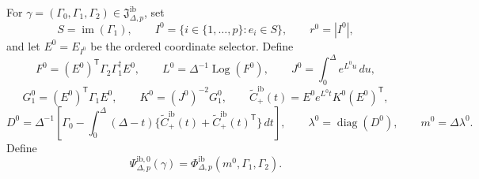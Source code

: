 For \(\gamma=(\Gamma_0,\Gamma_1,\Gamma_2)\in\mathfrak J_{\Delta,p}^{\mathrm{ib}}\), set
\[
 S=\operatorname{im}(\Gamma_1),\qquad
 I^0=\{i\in\{1,\ldots,p\}:e_i\in S\},\qquad
 r^0=|I^0|,
\]
and let \(E^0=E_{I^0}\) be the ordered coordinate selector.  Define
\[
 F^0=(E^0)^{\mathsf T}\Gamma_2\Gamma_1^\dagger E^0,\qquad
 L^0=\Delta^{-1}\operatorname{Log}(F^0),\qquad
 J^0=\int_0^\Delta e^{L^0u}\,du,
\]
\[
 G_1^0=(E^0)^{\mathsf T}\Gamma_1E^0,\qquad
 K^0=(J^0)^{-2}G_1^0,\qquad
 \widetilde C_{+}^{\mathrm{ib}}(t)=E^0e^{L^0t}K^0(E^0)^{\mathsf T},
\]
\[
 D^0=\Delta^{-1}\!\left[\Gamma_0-
 \int_0^\Delta(\Delta-t)
 \{\widetilde C_{+}^{\mathrm{ib}}(t)+\widetilde C_{+}^{\mathrm{ib}}(t)^{\mathsf T}\}\,dt\right],
 \qquad \lambda^0=\operatorname{diag}(D^0),
 \qquad m^0=\Delta\lambda^0.
\]
Define
\[
 \Psi_{\Delta,p}^{\mathrm{ib},0}(\gamma)
 =\Phi_{\Delta,p}^{\mathrm{ib}}(m^0,\Gamma_1,\Gamma_2).
\]